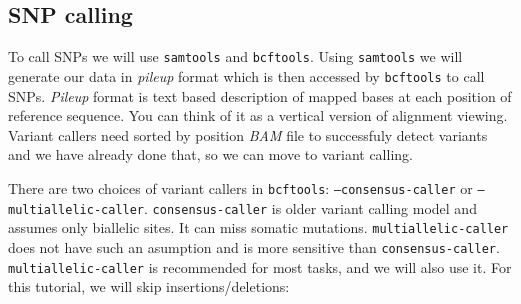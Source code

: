 \subsection{SNP calling}

To call SNPs we will use \texttt{samtools} and \texttt{bcftools}.
Using \texttt{samtools} we will generate our data in \textit{pileup} format which
is then accessed by \texttt{bcftools} to call SNPs.
\textit{Pileup} format is text based description of mapped bases at each position of reference sequence.
You can think of it as a vertical version of alignment viewing.
Variant callers need sorted by position \textit{BAM} file to successfuly detect variants
and we have already done that, so we can move to variant calling.

There are two choices of variant callers in \texttt{bcftools}:
\texttt{--consensus-caller} or \texttt{--multiallelic-caller}. \texttt{consensus-caller} is
older variant calling model and assumes only biallelic sites. It can miss somatic mutations.
\texttt{multiallelic-caller} does not have such an asumption and is more sensitive than \texttt{consensus-caller}.
\texttt{multiallelic-caller} is recommended for most tasks, and we will also use it. For this tutorial, we will skip insertions/deletions: \\~\\
